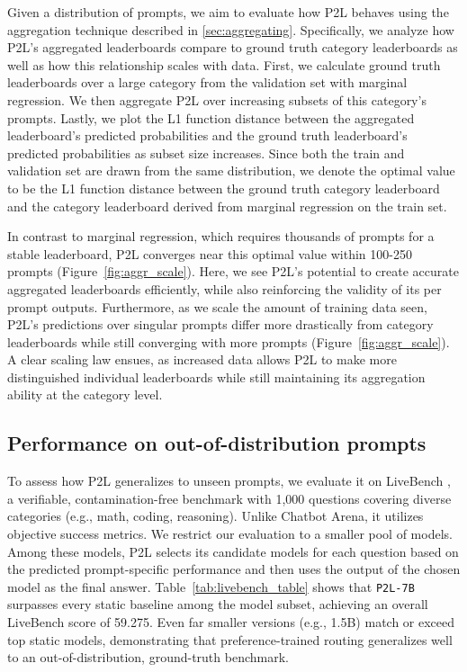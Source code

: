 Given a distribution of prompts, we aim to evaluate how P2L behaves using the aggregation technique described in \ref{sec:aggregating}. Specifically, we analyze how P2L’s aggregated leaderboards compare to ground truth category leaderboards as well as how this relationship scales with data. First, we calculate ground truth leaderboards over a large category from the validation set with marginal regression. We then aggregate P2L over increasing subsets of this category's prompts. Lastly, we plot the L1 function distance between the aggregated leaderboard’s predicted probabilities and the ground truth leaderboard’s predicted probabilities as subset size increases. Since both the train and validation set are drawn from the same distribution, we denote the optimal value to be the L1 function distance between the ground truth category leaderboard and the category leaderboard derived from marginal regression on the train set. 

In contrast to marginal regression, which requires thousands of prompts for a stable leaderboard, P2L converges near this optimal value within 100-250 prompts (Figure~\ref{fig:aggr_scale}). Here, we see P2L’s potential to create accurate aggregated leaderboards efficiently, while also reinforcing the validity of its per prompt outputs. Furthermore, as we scale the amount of training data seen, P2L’s predictions over singular prompts differ more drastically from category leaderboards while still converging with more prompts (Figure~\ref{fig:aggr_scale}). A clear scaling law ensues, as increased data allows P2L to make more distinguished individual leaderboards while still maintaining its aggregation ability at the category level. 


 \subsection{Performance on out-of-distribution prompts}
\label{sec:out-of-distribution}

To assess how P2L generalizes to unseen prompts, we evaluate it on LiveBench  \citep{white2024livebench}, a verifiable, contamination-free benchmark with 1{,}000 questions covering diverse categories (e.g., math, coding, reasoning). 
Unlike Chatbot Arena, it utilizes objective success metrics.
We restrict our evaluation to a smaller pool of models. Among these models, P2L selects its candidate models for each question based on the predicted prompt-specific performance and then uses the output of the chosen model as the final answer. Table~\ref{tab:livebench_table} shows that \texttt{P2L-7B} surpasses every static baseline among the model subset, achieving an overall LiveBench score of 59.275. Even far smaller versions (e.g., 1.5B) match or exceed top static models, demonstrating that preference-trained routing generalizes well to an out-of-distribution, ground-truth benchmark.

